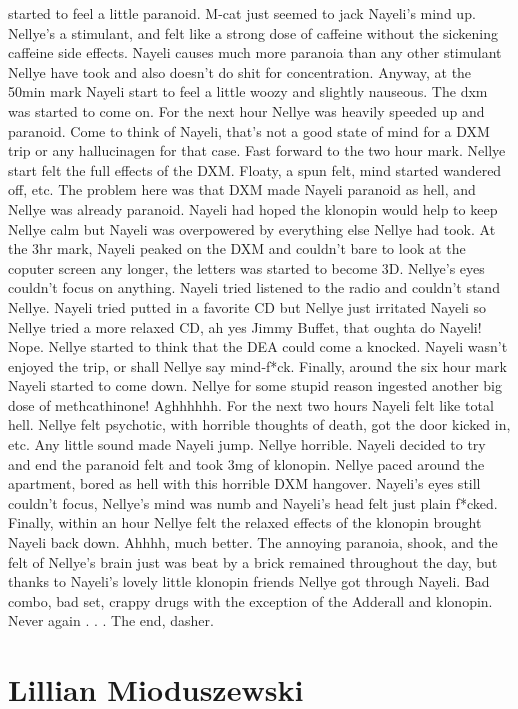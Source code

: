 \documentclass[12pt]{book}
\begin{document}
started to feel a little paranoid. M-cat just seemed to jack Nayeli's mind up. Nellye's a stimulant, and felt like a strong dose of caffeine without the sickening caffeine side effects. Nayeli causes much more paranoia than any other stimulant Nellye have took and also doesn't do shit for concentration. Anyway, at the 50min mark Nayeli start to feel a little woozy and slightly nauseous. The dxm was started to come on. For the next hour Nellye was heavily speeded up and paranoid. Come to think of Nayeli, that's not a good state of mind for a DXM trip or any hallucinagen for that case. Fast forward to the two hour mark. Nellye start felt the full effects of the DXM. Floaty, a spun felt, mind started wandered off, etc. The problem here was that DXM made Nayeli paranoid as hell, and Nellye was already paranoid. Nayeli had hoped the klonopin would help to keep Nellye calm but Nayeli was overpowered by everything else Nellye had took. At the 3hr mark, Nayeli peaked on the DXM and couldn't bare to look at the coputer screen any longer, the letters was started to become 3D. Nellye's eyes couldn't focus on anything. Nayeli tried listened to the radio and couldn't stand Nellye. Nayeli tried putted in a favorite CD but Nellye just irritated Nayeli so Nellye tried a more relaxed CD, ah yes Jimmy Buffet, that oughta do Nayeli! Nope. Nellye started to think that the DEA could come a knocked. Nayeli wasn't enjoyed the trip, or shall Nellye say mind-f*ck. Finally, around the six hour mark Nayeli started to come down. Nellye for some stupid reason ingested another big dose of methcathinone! Aghhhhhh. For the next two hours Nayeli felt like total hell. Nellye felt psychotic, with horrible thoughts of death, got the door kicked in, etc. Any little sound made Nayeli jump. Nellye horrible. Nayeli decided to try and end the paranoid felt and took 3mg of klonopin. Nellye paced around the apartment, bored as hell with this horrible DXM hangover. Nayeli's eyes still couldn't focus, Nellye's mind was numb and Nayeli's head felt just plain f*cked. Finally, within an hour Nellye felt the relaxed effects of the klonopin brought Nayeli back down. Ahhhh, much better. The annoying paranoia, shook, and the felt of Nellye's brain just was beat by a brick remained throughout the day, but thanks to Nayeli's lovely little klonopin friends Nellye got through Nayeli. Bad combo, bad set, crappy drugs with the exception of the Adderall and klonopin. Never again . . .  The end, dasher.



\chapter{Lillian Mioduszewski}
\end{document}
